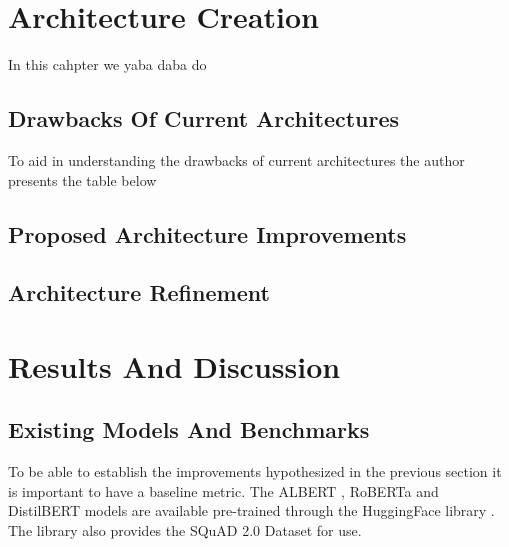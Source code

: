 \documentclass[a4paper,12pt]{report}
\begin{document}
  \chapter{Architecture Creation}\label{c4}

     In this cahpter we yaba daba do
       \section{Drawbacks Of Current Architectures}\label{c42}
       
       To aid in understanding the drawbacks of current architectures the author presents the table below
       \section{Proposed Architecture Improvements}\label{c43}
       \section{Architecture Refinement}\label{c44}

    \chapter{Results And Discussion}\label{c5}
     \section{Existing Models And Benchmarks}\label{c41}
    
    To be able to establish the improvements hypothesized in the previous section it is important to have a baseline metric. The ALBERT \citep{albert}, RoBERTa \citep{roberta} and DistilBERT \citep{distil} models are available pre-trained through the HuggingFace library \citep{hfTransformers}. The library also provides the SQuAD 2.0 Dataset \citep{dataset} for use.
    
\end{document}
